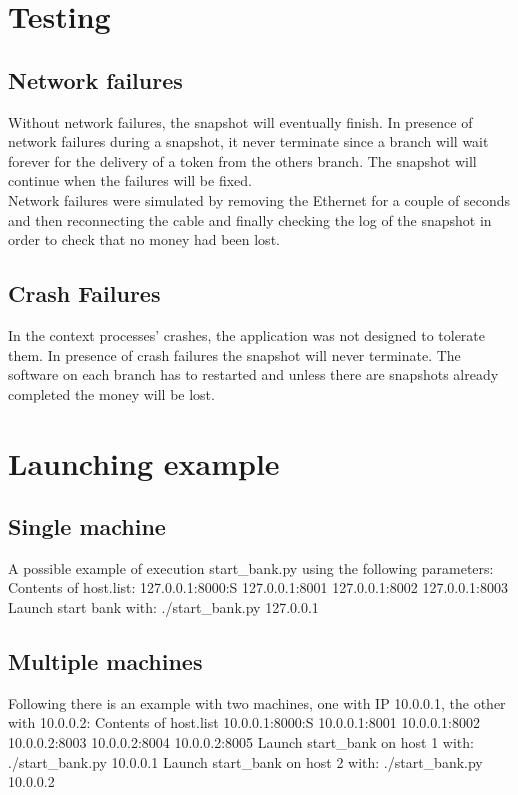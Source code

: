 \documentclass{article}
\begin{document}
\section{Testing}
    \subsection{Network failures}
        Without network failures, the snapshot will eventually finish. In presence of network failures during a snapshot, it never terminate since a branch will wait forever for the delivery of a token from the others branch. The snapshot will continue when the failures will be fixed.\\
        Network failures were simulated by removing the Ethernet for a couple of seconds and then reconnecting the cable and finally checking the log of the snapshot in order to check that no money had been lost.
    \subsection{Crash Failures}
        In the context processes’ crashes, the application was not designed to tolerate them.
        In presence of crash failures the snapshot will never terminate. The software on each branch has to restarted and unless there are snapshots already completed the money will be lost.

\section{Launching example}
        \subsection{Single machine}
        A possible example of execution start\_bank.py using the following parameters:
        Contents of host.list:
        127.0.0.1:8000:S
        127.0.0.1:8001
        127.0.0.1:8002
        127.0.0.1:8003
        Launch start bank with:
        ./start\_bank.py 127.0.0.1\\
        \subsection{Multiple machines}
        Following there is an example with two machines, one with IP 10.0.0.1, the other with 10.0.0.2:
        Contents of host.list
        10.0.0.1:8000:S
        10.0.0.1:8001
        10.0.0.1:8002
        10.0.0.2:8003
        10.0.0.2:8004
        10.0.0.2:8005
        Launch start\_bank on host 1 with:
        ./start\_bank.py 10.0.0.1
        Launch start\_bank on host 2 with:
        ./start\_bank.py 10.0.0.2
\end{document}
